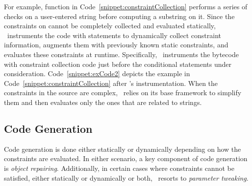 \begin{mylist}
For example, function  in Code~\ref{snippet:constraintCollection}
performs a series of checks on a user-entered string  before computing
a substring on it. Since the constraints on  cannot be completely
collected and evaluated statically, \tool\ instruments the code with statements
to dynamically collect constraint information, augments them with previously
known static constraints, and evaluates these constraints at runtime.
Specifically, \tool\ instruments the bytecode with constraint collection code
just before the conditional statements under consideration.
Code~\ref{snippet:exCode2} depicts the example in
Code~\ref{snippet:constraintCollection} after \tool's instrumentation. When the
constraints in the source are complex, \tool\ relies on its base framework to
simplify them and then evaluates only the ones that are related to strings.

\end{mylist}

\vspace{-0.1cm} 
\subsection{Code Generation}
\label{sec:tool:stage2:generation}

Code generation is done either statically or dynamically depending on how
the constraints are evaluated. In either scenario, a key component of code
generation is \textit{object repairing}. Additionally, in certain cases
where constraints cannot be satisfied, either statically or dynamically or
both, \tool\ resorts to \textit{parameter tweaking}.

